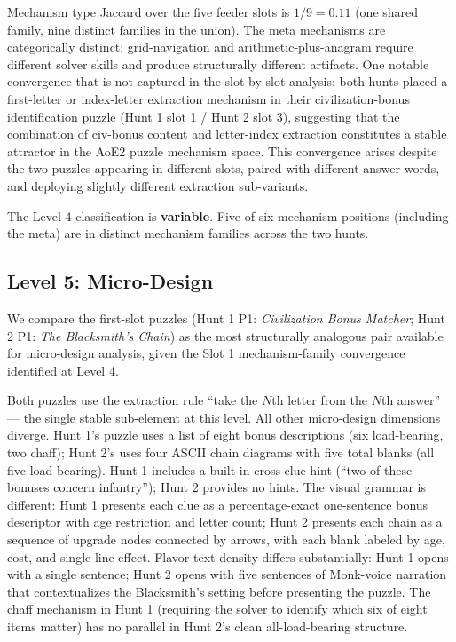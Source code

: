 Mechanism type Jaccard over the five feeder slots is $1/9 = 0.11$ (one shared family, nine distinct families in the union). The meta mechanisms are categorically distinct: grid-navigation and arithmetic-plus-anagram require different solver skills and produce structurally different artifacts. One notable convergence that is not captured in the slot-by-slot analysis: both hunts placed a first-letter or index-letter extraction mechanism in their civilization-bonus identification puzzle (Hunt 1 slot 1 / Hunt 2 slot 3), suggesting that the combination of civ-bonus content and letter-index extraction constitutes a stable attractor in the AoE2 puzzle mechanism space. This convergence arises despite the two puzzles appearing in different slots, paired with different answer words, and deploying slightly different extraction sub-variants.

The Level 4 classification is \textbf{variable}. Five of six mechanism positions (including the meta) are in distinct mechanism families across the two hunts.

\subsection{Level 5: Micro-Design}
\label{sec:results-micro}

We compare the first-slot puzzles (Hunt 1 P1: \textit{Civilization Bonus Matcher}; Hunt 2 P1: \textit{The Blacksmith's Chain}) as the most structurally analogous pair available for micro-design analysis, given the Slot 1 mechanism-family convergence identified at Level 4.

Both puzzles use the extraction rule ``take the $N$th letter from the $N$th answer'' --- the single stable sub-element at this level. All other micro-design dimensions diverge. Hunt 1's puzzle uses a list of eight bonus descriptions (six load-bearing, two chaff); Hunt 2's uses four ASCII chain diagrams with five total blanks (all five load-bearing). Hunt 1 includes a built-in cross-clue hint (``two of these bonuses concern infantry''); Hunt 2 provides no hints. The visual grammar is different: Hunt 1 presents each clue as a percentage-exact one-sentence bonus descriptor with age restriction and letter count; Hunt 2 presents each chain as a sequence of upgrade nodes connected by arrows, with each blank labeled by age, cost, and single-line effect. Flavor text density differs substantially: Hunt 1 opens with a single sentence; Hunt 2 opens with five sentences of Monk-voice narration that contextualizes the Blacksmith's setting before presenting the puzzle. The chaff mechanism in Hunt 1 (requiring the solver to identify which six of eight items matter) has no parallel in Hunt 2's clean all-load-bearing structure.

